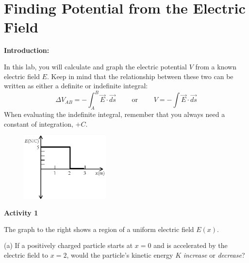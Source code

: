 
\section{Finding Potential from the Electric Field}

\makelabheader %

\vspace{0.4in}
\textbf{Introduction:}

In this lab, you will calculate and graph the electric potential $V$ from a known electric field $E$.  Keep in mind that the relationship between these two can be written as either a definite or indefinite integral:
\begin{displaymath}
\Delta V_{AB} = -\int_A^B{\vec{E} \cdot \vec{ds}} \qquad \textrm{ or } \qquad
V =-\int{\vec{E} \cdot \vec{ds}} 
\end{displaymath}
When evaluating the indefinite integral, remember that you always need a constant of integration, $+C$.  
\vspace{0.4in}

\begin{figure}
    \includegraphics[width=0.4\textwidth]{finding_v_from_e/fig1.eps}
\end{figure}

\textbf{Activity 1} 

The graph to the right shows a region of a uniform electric field $E(x)$.  

(a) If a positively charged particle starts at $x=0$ and is accelerated by the electric field to $x=2$, would the particle's kinetic energy $K$ \textit{increase} or \textit{decrease}?
\answerspace{0.7in}

